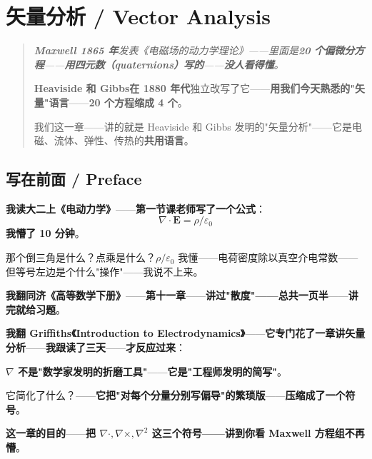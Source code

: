 
\chapter{矢量分析 / Vector Analysis}
\label{ch:vec}

\begin{quote}\itshape
\textbf{Maxwell 1865 年}发表《电磁场的动力学理论》——里面是\textbf{20 个偏微分方程}——\textbf{用四元数（quaternions）写的}——\textbf{没人看得懂}。

\medskip

\textbf{Heaviside 和 Gibbs}\textbf{在 1880 年代}独立改写了它——\textbf{用我们今天熟悉的"矢量"语言}——\textbf{20 个方程缩成 4 个}。

\medskip

我们这一章——讲的就是 Heaviside 和 Gibbs 发明的"矢量分析"——它是电磁、流体、弹性、传热的\textbf{共用语言}。
\end{quote}

\section{写在前面 / Preface}

\textbf{我读大二上《电动力学》}——\textbf{第一节课老师写了一个公式}：
\[
\nabla \cdot \bm{E} = \rho / \varepsilon_0
\]
\textbf{我懵了 10 分钟}。

那个倒三角是什么？点乘是什么？$\rho / \varepsilon_0$ 我懂——电荷密度除以真空介电常数——但等号左边是个什么"操作"——我说不上来。

\textbf{我翻同济《高等数学下册》}——\textbf{第十一章}——\textbf{讲过"散度"——总共一页半}——\textbf{讲完就给习题}。

\textbf{我翻 Griffiths《Introduction to Electrodynamics》}——\textbf{它专门花了一章讲矢量分析}——\textbf{我跟读了三天}——\textbf{才反应过来}：

\textbf{$\nabla$ 不是"数学家发明的折磨工具"}——\textbf{它是"工程师发明的简写"}。

它简化了什么？——\textbf{它把"对每个分量分别写偏导"的繁琐版}——\textbf{压缩成了一个符号}。

\textbf{这一章的目的}——\textbf{把 $\nabla \cdot, \nabla \times, \nabla^2$ 这三个符号——讲到你看 Maxwell 方程组不再懵}。

